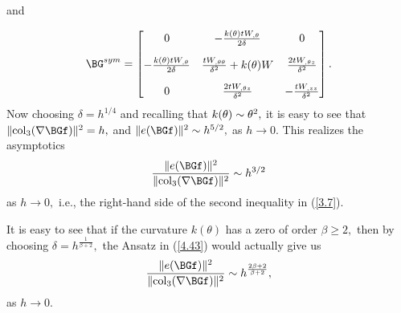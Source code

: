 and

$$
\BG^{sym}=\begin{bmatrix} 
0    &    -\frac{k(\theta)tW_{,\theta}}{2\delta}    &     0 \\[10pt]
-\frac{k(\theta)tW_{,\theta}}{2\delta}    &    \frac{tW_{,\theta\theta}}{\delta^2}+k(\theta)W  &   \frac{2tW_{,\theta z}}{\delta^2} \\[10pt]
0    &    \frac{2tW_{,\theta z}}{\delta^2}    &    -\frac{tW_{,zz}}{\delta^2}
\end{bmatrix}.
$$
Now choosing $\delta=h^{1/4}$ and recalling that $k(\theta)\sim\theta^2,$ it is easy to see that $\|\mathrm{col}_3(\nabla\BGf)\|^2=h,$ 
and $\|e(\BGf)\|^2\sim h^{5/2},$ as $h\to 0.$ This realizes the asymptotics 
$$\frac{\|e(\BGf)\|^2}{\|\mathrm{col}_3(\nabla\BGf)\|^2}\sim h^{3/2}$$ 
as $h\to 0,$ i.e., the right-hand side of the second inequality in (\ref{3.7}). 

\begin{remark}
\label{rem:4.2}
It is easy to see that if the curvature $k(\theta)$ has a zero of order $\beta\geq 2,$ then by choosing $\delta=h^{\frac{1}{\beta+2}},$ the Ansatz in (\ref{4.43}) would actually give us $$\frac{\|e(\BGf)\|^2}{\|\mathrm{col}_3(\nabla\BGf)\|^2}\sim h^{\frac{2\beta+2}{\beta+2}},$$
as $h\to 0.$
\end{remark}



